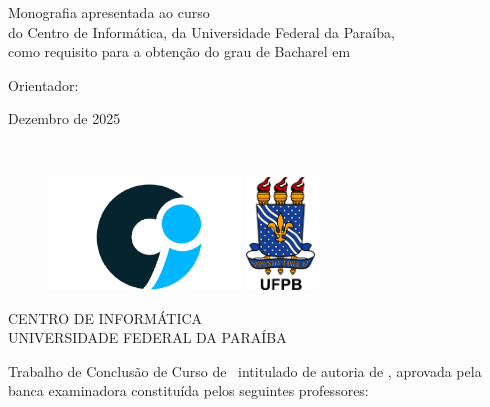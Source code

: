 \documentclass{tcc}
\begin{document}
\begin{flushright}
Monografia apresentada ao curso \nomedocurso \\ do Centro de Informática, da Universidade Federal da Paraíba, \\ como requisito para a obtenção do grau de Bacharel em \titulobar
\\
\vspace{0.2in}

Orientador: \orientador

\end{flushright}

\vfill
\begin{center}
Dezembro de 2025
\end{center}

\newpage

$ $
\vfill

\newpage

\begin{figure}[H]
\centering
\includegraphics[height=3cm]{figures/ci_logo.png}
\hspace{1cm}
\includegraphics[height=3cm]{figures/ufpb_logo.png}
\end{figure}

\begin{center}
CENTRO DE INFORMÁTICA \\
UNIVERSIDADE FEDERAL DA PARAÍBA
\end{center}

\vspace{0.05in}

Trabalho de Conclusão de Curso de \nomedocurso \ intitulado \textit{\bf \em \thetitle} de autoria de \theauthor, aprovada pela banca examinadora constituída pelos seguintes professores: \\
\end{document}
